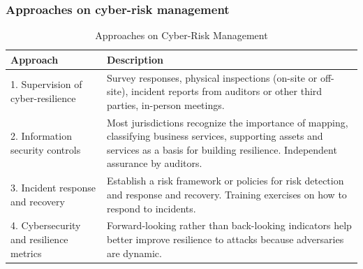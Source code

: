 \subsubsection{Approaches on cyber-risk management}
\begin{table}[H]
    \centering
    \caption{Approaches on Cyber-Risk Management}
    \renewcommand{\arraystretch}{1.5} %

    \begin{tabular}{|p{5cm}|p{13cm}|}
        \hline
        \textbf{Approach} & \textbf{Description} \\ \hline
        1. Supervision of cyber-resilience & Survey responses, physical inspections (on-site or off-site), incident reports from auditors or other third parties, in-person meetings. \\ \hline
        2. Information security controls & Most jurisdictions recognize the importance of mapping, classifying business services, supporting assets and services as a basis for building resilience. Independent assurance by auditors. \\ \hline
        3. Incident response and recovery & Establish a risk framework or policies for risk detection and response and recovery. Training exercises on how to respond to incidents. \\ \hline
        4. Cybersecurity and resilience metrics & Forward-looking rather than back-looking indicators help better improve resilience to attacks because adversaries are dynamic. \\ \hline
    \end{tabular}
\end{table}





